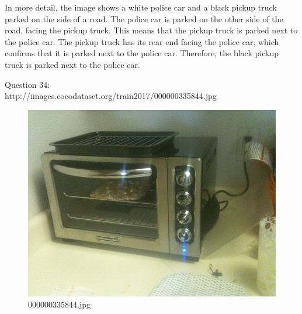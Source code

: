 \begin{enumerate}
        In more detail, the image shows a white police car and a black pickup truck parked on the side of a road. The police car is parked on the other side of the road, facing the pickup truck. This means that the pickup truck is parked next to the police car. The pickup truck has its rear end facing the police car, which confirms that it is parked next to the police car. Therefore, the black pickup truck is parked next to the police car.
    \end{enumerate}
    Question 34:\\http://images.cocodataset.org/train2017/000000335844.jpg
    \begin{figure}[h]
        \centering
        \includegraphics[width=0.8\linewidth]{../image set/easy/000000335844.jpg}
        \caption{000000335844.jpg}
    \end{figure}
